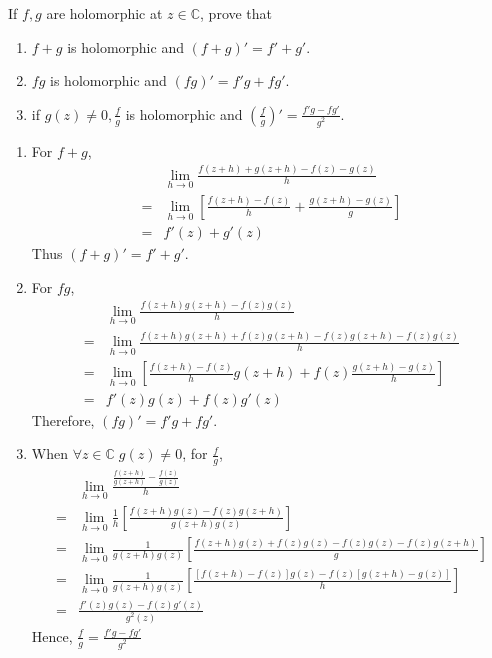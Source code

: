 \documentclass[notoc,notitlepage]{tufte-book}
\begin{document}
\begin{ex}\label{ex:holomorphic_functions_properties}
	If $f, g$ are holomorphic at $z \in \mathbb{C}$, prove that
	\begin{enumerate}
		\item $f + g$ is holomorphic and $(f + g)' = f' + g'$. \label{item:holomorphic_linearity}
		\item $fg$ is holomorphic and $(fg)' = f'g + fg'$. \label{item:holomorphic_product_rule}
		\item if $g(z) \neq 0, \frac{f}{g}$ is holomorphic and $(\frac{f}{g})' = \frac{f'g - fg'}{g^2}$. \label{item:holomorphic_quotient_rule}
	\end{enumerate}

	\begin{solution}
		\begin{enumerate}
			\item For $f + g$,
			\begin{align*}
					&\lim_{h \to 0} \frac{f(z + h) + g(z + h) - f(z) - g(z)}{h} \\
				= &\lim_{h \to 0} \left[ \frac{f(z + h) - f(z)}{h} + \frac{g(z + h) - g(z)}{g} \right] \\
				= & f'(z) + g'(z) 
			\end{align*}
			Thus $(f + g)' = f' + g'$.

			\item For $fg$,
			\begin{align*}
					&\lim_{h \to 0} \frac{f(z + h)g(z + h) - f(z)g(z)}{h} \\
				= &\lim_{h \to 0} \frac{f(z + h)g(z + h) + f(z)g(z + h) - f(z)g(z + h) - f(z)g(z)}{h} \\
				= &\lim_{h \to 0} \left[ \frac{f(z + h) - f(z)}{h} g(z + h) + f(z) \frac{g(z + h) - g(z)}{h} \right] \\
				= &f'(z)g(z) + f(z)g'(z)
			\end{align*}
			Therefore, $(fg)' = f'g + fg'$.

			\item When $\forall z \in \mathbb{C} \; g(z) \neq 0$, for $\frac{f}{g}$,
			\begin{align*}
					&\lim_{h \to 0} \frac{\frac{f(z + h)}{g(z + h)} - \frac{f(z)}{g(z)}}{h} \\
				= &\lim_{h \to 0} \frac{1}{h} \left[ \frac{f(z + h)g(z) - f(z)g(z + h)}{g(z + h)g(z)} \right] \\
				= &\lim_{h \to 0} \frac{1}{g(z + h)g(z)} \left[ \frac{f(z + h)g(z) + f(z)g(z) - f(z)g(z) - f(z)g(z + h)}{g} \right] \\
				= &\lim_{h \to 0} \frac{1}{g(z + h)g(z)} \left[ \frac{[f(z + h) - f(z)]g(z) - f(z)[g(z + h) - g(z)]}{h} \right] \\
				= &\frac{f'(z)g(z) - f(z)g'(z)}{g^2(z)}  
			\end{align*}
			Hence, $\frac{f}{g} = \frac{f'g - fg'}{g^2} $
		\end{enumerate}
	\end{solution}
\end{ex}
\end{document}
